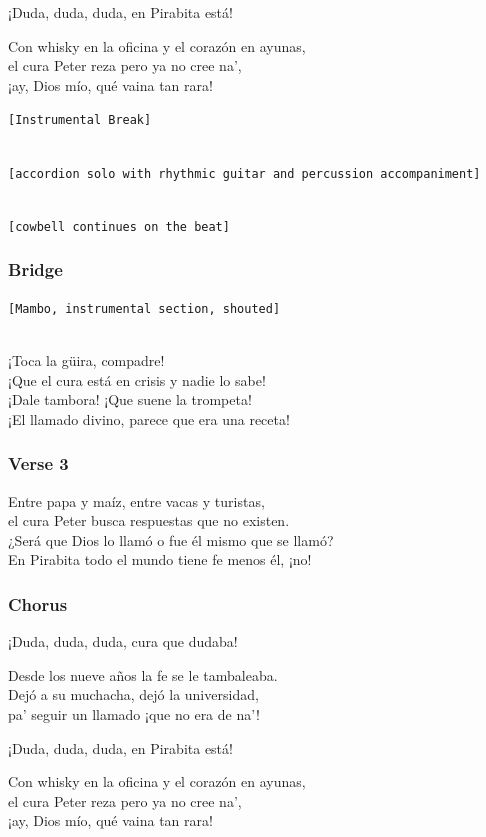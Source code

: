 ¡Duda, duda, duda, en Pirabita está!

Con whisky en la oficina y el corazón en ayunas,\\
el cura Peter reza pero ya no cree na',\\
¡ay, Dios mío, qué vaina tan rara!

\texttt{{[}Instrumental\ Break{]}}\strut \\
\texttt{{[}accordion\ solo\ with\ rhythmic\ guitar\ and\ percussion\ accompaniment{]}}\strut \\
\texttt{{[}cowbell\ continues\ on\ the\ beat{]}}

\subsubsection{Bridge}\label{bridge-12}

\texttt{{[}Mambo,\ instrumental\ section,\ shouted{]}}\strut \\
¡Toca la güira, compadre!\\
¡Que el cura está en crisis y nadie lo sabe!\\
¡Dale tambora! ¡Que suene la trompeta!\\
¡El llamado divino, parece que era una receta!

\subsubsection{Verse 3}\label{verse-3-7}

Entre papa y maíz, entre vacas y turistas,\\
el cura Peter busca respuestas que no existen.\\
¿Será que Dios lo llamó o fue él mismo que se llamó?\\
En Pirabita todo el mundo tiene fe menos él, ¡no!

\subsubsection{Chorus}\label{chorus-35}

¡Duda, duda, duda, cura que dudaba!

Desde los nueve años la fe se le tambaleaba.\\
Dejó a su muchacha, dejó la universidad,\\
pa' seguir un llamado ¡que no era de na'!

¡Duda, duda, duda, en Pirabita está!

Con whisky en la oficina y el corazón en ayunas,\\
el cura Peter reza pero ya no cree na',\\
¡ay, Dios mío, qué vaina tan rara!

